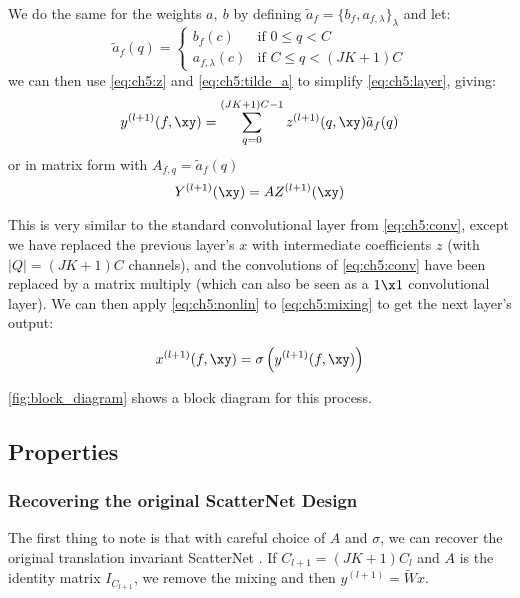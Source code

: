 We do the same for the weights $a,\ b$ by defining $\tilde{a}_f = \{b_f, a_{f,
\lambda} \}_{\lambda}$ and let:
\begin{equation}
  \tilde{a}_f(q) =  \left\{
    \begin{array}{ll}
      b_f(c) & \mbox{if } 0 \leq q < C \\
      a_{f, \lambda}(c) & \mbox{if }	C \leq q < (JK+1)C
    \end{array}
    \right. \label{eq:ch5:tilde_a}
\end{equation}
%
we can then use \eqref{eq:ch5:z} and \eqref{eq:ch5:tilde_a} to simplify 
\eqref{eq:ch5:layer}, giving:
\begin{equation}
  y^{(l+1)}(f, \xy)  =  \sum_{q=0}^{(JK + 1)C - 1} z^{(l+1)}(q, \xy) \tilde{a}_f(q) \label{eq:ch5:mixing}
\end{equation}
or in matrix form with $A_{f,q} = \tilde{a}_f(q)$
%
\begin{equation}
  Y^{(l+1)}(\xy)  =  A Z^{(l+1)}(\xy) \label{eq:ch5:matrix}
\end{equation}

This is very similar to the standard convolutional layer from
\eqref{eq:ch5:conv}, except we have replaced the previous layer's $x$ with
intermediate coefficients $z$ (with $|Q| = (JK+1)C$ channels), and the
convolutions of \eqref{eq:ch5:conv} have been replaced by a matrix multiply
(which can also be seen as a $1\x 1$ convolutional layer). We can then apply
\eqref{eq:ch5:nonlin} to \eqref{eq:ch5:mixing} to get the next layer's output:

\begin{equation}
  x^{(l+1)}(f, \xy) = \sigma\left( y^{(l+1)}(f, \xy) \right)
  \label{eq:ch5:xnext}
\end{equation}

\autoref{fig:block_diagram} shows a block diagram for this process. 



\subsection{Properties}
\subsubsection{Recovering the original ScatterNet Design}
The first thing to note is that with careful choice of $A$ and $\sigma$, we can
recover the original translation invariant ScatterNet
\cite{bruna_invariant_2013, oyallon_scaling_2017}. If $C_{l+1} = (JK+1)C_l$ 
and $A$ is the identity matrix $I_{C_{l+1}}$, we remove the mixing and then $y^{(l+1)} = \tilde{W}x$.


